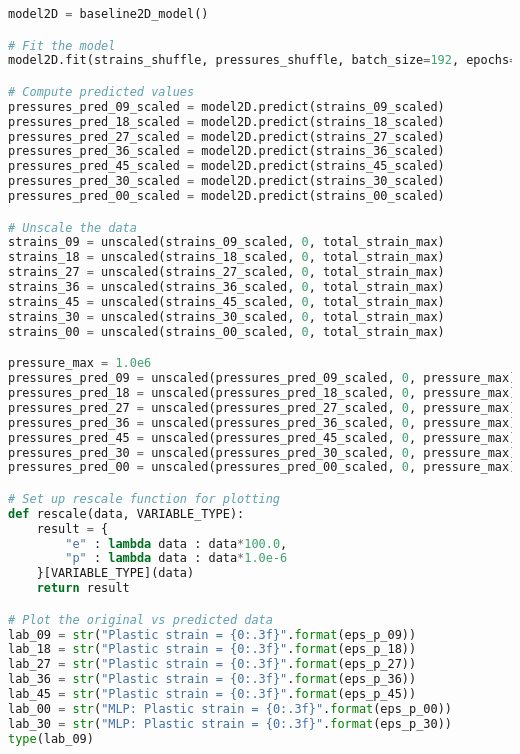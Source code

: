 \begin{lstlisting}[language=Python]
model2D = baseline2D_model()

# Fit the model
model2D.fit(strains_shuffle, pressures_shuffle, batch_size=192, epochs=3000, verbose=1, validation_split=0.2, shuffle=True)

# Compute predicted values
pressures_pred_09_scaled = model2D.predict(strains_09_scaled)
pressures_pred_18_scaled = model2D.predict(strains_18_scaled)
pressures_pred_27_scaled = model2D.predict(strains_27_scaled)
pressures_pred_36_scaled = model2D.predict(strains_36_scaled)
pressures_pred_45_scaled = model2D.predict(strains_45_scaled)
pressures_pred_30_scaled = model2D.predict(strains_30_scaled)
pressures_pred_00_scaled = model2D.predict(strains_00_scaled)

# Unscale the data
strains_09 = unscaled(strains_09_scaled, 0, total_strain_max)
strains_18 = unscaled(strains_18_scaled, 0, total_strain_max)
strains_27 = unscaled(strains_27_scaled, 0, total_strain_max)
strains_36 = unscaled(strains_36_scaled, 0, total_strain_max)
strains_45 = unscaled(strains_45_scaled, 0, total_strain_max)
strains_30 = unscaled(strains_30_scaled, 0, total_strain_max)
strains_00 = unscaled(strains_00_scaled, 0, total_strain_max)

pressure_max = 1.0e6
pressures_pred_09 = unscaled(pressures_pred_09_scaled, 0, pressure_max)
pressures_pred_18 = unscaled(pressures_pred_18_scaled, 0, pressure_max)
pressures_pred_27 = unscaled(pressures_pred_27_scaled, 0, pressure_max)
pressures_pred_36 = unscaled(pressures_pred_36_scaled, 0, pressure_max)
pressures_pred_45 = unscaled(pressures_pred_45_scaled, 0, pressure_max)
pressures_pred_30 = unscaled(pressures_pred_30_scaled, 0, pressure_max)
pressures_pred_00 = unscaled(pressures_pred_00_scaled, 0, pressure_max)

# Set up rescale function for plotting
def rescale(data, VARIABLE_TYPE):
    result = {
        "e" : lambda data : data*100.0,
        "p" : lambda data : data*1.0e-6
    }[VARIABLE_TYPE](data)
    return result

# Plot the original vs predicted data
lab_09 = str("Plastic strain = {0:.3f}".format(eps_p_09))
lab_18 = str("Plastic strain = {0:.3f}".format(eps_p_18))
lab_27 = str("Plastic strain = {0:.3f}".format(eps_p_27))
lab_36 = str("Plastic strain = {0:.3f}".format(eps_p_36))
lab_45 = str("Plastic strain = {0:.3f}".format(eps_p_45))
lab_00 = str("MLP: Plastic strain = {0:.3f}".format(eps_p_00))
lab_30 = str("MLP: Plastic strain = {0:.3f}".format(eps_p_30))
type(lab_09)


\end{lstlisting}

